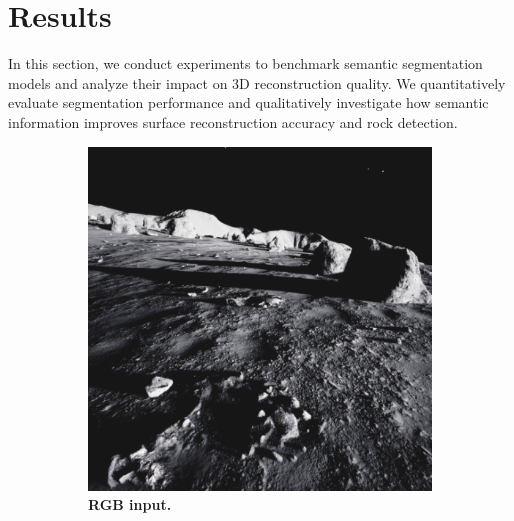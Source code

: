 \section{Results}
In this section, we conduct experiments to benchmark semantic segmentation models and analyze their impact on 3D reconstruction quality. We quantitatively evaluate segmentation performance and qualitatively investigate how semantic information improves surface reconstruction accuracy and rock detection.

\begin{figure}[b!]
	\centering
	\begin{subfigure}[b]{0.16\textwidth}
		\includegraphics[width=\textwidth]{figures/rgb.png}
		\caption{\bfseries RGB input.}
	\end{subfigure}\hfill
	\begin{subfigure}[b]{0.16\textwidth}

\end{subfigure}
\end{figure}
